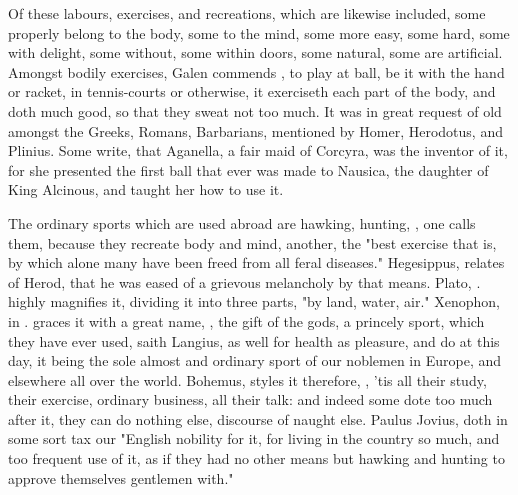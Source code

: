 {Of these labours, exercises, and recreations, which are likewise included, some properly belong to the body, some to the mind, some more easy, some hard, some with delight, some without, some within doors, some natural, some are artificial. Amongst bodily exercises, Galen commends , to play at ball, be it with the hand or racket, in tennis-courts or otherwise, it exerciseth each part of the body, and doth much good, so that they sweat not too much. It was in great request of old amongst the Greeks, Romans, Barbarians, mentioned by Homer, Herodotus, and Plinius. Some write, that Aganella, a fair maid of Corcyra, was the inventor of it, for she presented the first ball that ever was made to Nausica, the daughter of King Alcinous, and taught her how to use it.

The ordinary sports which are used abroad are hawking, hunting, , one calls them, because they recreate body and mind, another, the "best exercise that is, by which alone many have been freed from all feral diseases." Hegesippus,  relates of Herod, that he was eased of a grievous melancholy by that means. Plato, . highly magnifies it, dividing it into three parts, "by land, water, air." Xenophon, in . graces it with a great name, , the gift of the gods, a princely sport, which they have ever used, saith Langius,  as well for health as pleasure, and do at this day, it being the sole almost and ordinary sport of our noblemen in Europe, and elsewhere all over the world. Bohemus,  styles it therefore, , 'tis all their study, their exercise, ordinary business, all their talk: and indeed some dote too much after it, they can do nothing else, discourse of naught else. Paulus Jovius,  doth in some sort tax our "English nobility for it, for living in the country so much, and too frequent use of it, as if they had no other means but hawking and hunting to approve themselves gentlemen with."

}
